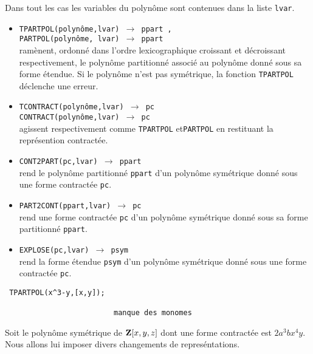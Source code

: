 \documentclass[11pt]{article}
\begin{document}
Dans tout les cas les variables du polyn\^ome sont contenues dans la liste
{\tt lvar}.
\begin{itemize}
\item {\tt TPARTPOL(polyn\^ome,lvar) 
$\longrightarrow$ ppart ,\\
       PARTPOL(polyn\^ome, lvar) 
$\longrightarrow$ ppart}\\
 ram\`{e}nent, ordonn\'e dans l'ordre lexicographique croissant et
d\'ecroissant respectivement, le
polyn\^{o}me partitionn\'{e} associ\'{e} au polyn\^{o}me donn\'e sous sa forme
\'etendue. Si le polyn\^ome n'est pas sym\'etrique, la fonction
{\tt TPARTPOL} d\'eclenche une erreur.

\item {\tt TCONTRACT(polyn\^ome,lvar)
 $\longrightarrow$ pc}\\
 {\tt CONTRACT(polyn\^ome,lvar)
 $\longrightarrow$ pc}\\
agissent respectivement comme {\tt TPARTPOL} et{\tt PARTPOL} en restituant la repr\'esention contract\'ee.

\item  {\tt CONT2PART(pc,lvar) 
 $\longrightarrow$ ppart }\\
rend le polyn\^ome partitionn\'e {\tt ppart} d'un polyn\^ome sym\'etrique
donn\'e sous une forme contract\'ee {\tt pc}.

\item {\tt PART2CONT(ppart,lvar) 
 $\longrightarrow$ pc }\\
rend une forme contract\'ee {\tt pc} d'un polyn\^ome sym\'etrique
donn\'e sous sa forme partitionn\'e {\tt ppart}.

\item  {\tt EXPLOSE(pc,lvar) 
$\longrightarrow$ psym }\\
rend la forme \'etendue {\tt psym} d'un polyn\^ome sym\'etrique
donn\'e sous une forme contract\'ee {\tt pc}.

\end{itemize}
\small
\begin{verbatim}
 TPARTPOL(x^3-y,[x,y]);

                         manque des monomes
\end{verbatim}
Soit le  polyn\^ome sym\'etrique de ${\bf Z}[x,y,z]$ dont une forme 
contract\'ee est $2a^3bx^4y$. Nous allons lui imposer divers changements
de repres\'entations.
\end{document}
